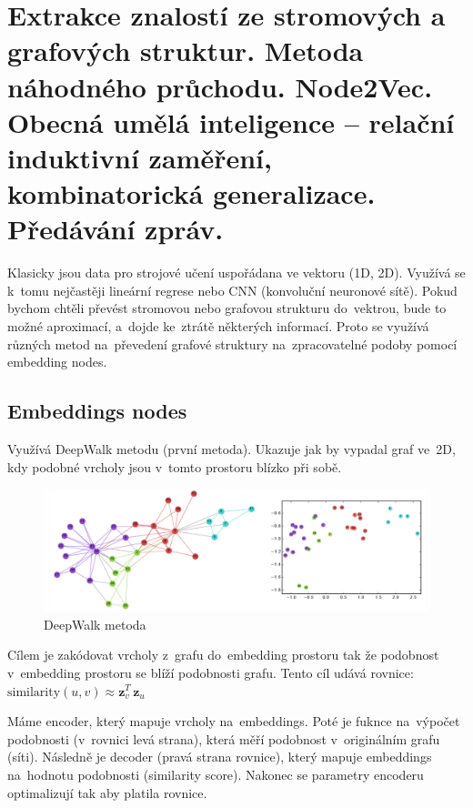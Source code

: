 \clearpage
\section{Extrakce znalostí ze stromových a grafových struktur. Metoda náhodného průchodu. Node2Vec. Obecná umělá inteligence – relační induktivní zaměření, kombinatorická generalizace. Předávání zpráv.}

Klasicky jsou data pro strojové učení uspořádana ve vektoru (1D, 2D). 
Využívá se k~tomu nejčastěji lineární regrese nebo CNN (konvoluční neuronové sítě). 
Pokud bychom chtěli převést stromovou nebo grafovou strukturu do~vektrou, bude to možné aproximací, a~dojde ke~ztrátě některých informací.
Proto se využívá různých metod na~převedení grafové struktury na~zpracovatelné podoby pomocí embedding nodes.

\subsection{Embeddings nodes}

Využívá DeepWalk metodu (první metoda). 
Ukazuje jak by vypadal graf ve~2D, kdy podobné vrcholy jsou v~tomto prostoru blízko při sobě.

\begin{figure}[ht]
    \centering
    \includegraphics[width=\textwidth]{images/11_deepwalk-graf}
    \caption{DeepWalk metoda}
\end{figure}

Cílem je zakódovat vrcholy z~grafu do~embedding prostoru tak že podobnost v~embedding prostoru se blíží podobnosti grafu.
Tento cíl udává rovnice:
$\text{similarity}(u,v)\approx \mathbf{z}_{v}^{T}\,\mathbf{z}_{u}$

Máme encoder, který mapuje vrcholy na~embeddings. 
Poté je fuknce na~výpočet podobnosti (v~rovnici levá strana), která měří podobnost v~originálním grafu (síti).
Následně je decoder (pravá strana rovnice), který mapuje embeddings na~hodnotu podobnosti (similarity score).
Nakonec se parametry encoderu optimalizují tak aby platila rovnice.

